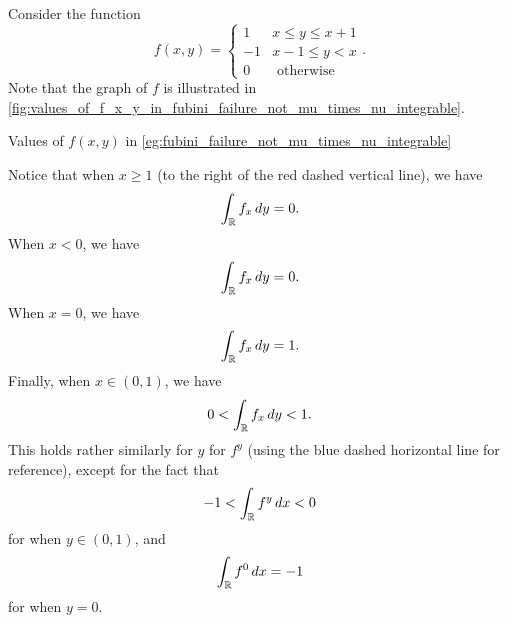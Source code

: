 \documentclass[notoc,notitlepage]{tufte-book}
\begin{document}
\begin{eg}\label{eg:fubini_failure_not_mu_times_nu_integrable}
  Consider the function
  \begin{equation*}
    f(x, y) = \begin{cases}
      1 & x \leq y \leq x + 1 \\
      -1 & x - 1 \leq y < x \\
      0 & \text{ otherwise }
    \end{cases}.
  \end{equation*}
  Note that the graph of $f$ is illustrated in
  \cref{fig:values_of_f_x_y_in_fubini_failure_not_mu_times_nu_integrable}.
  \begin{marginfigure}
    \centering
    \caption{Values of $f(x, y)$ in \cref{eg:fubini_failure_not_mu_times_nu_integrable}}\label{fig:values_of_f_x_y_in_fubini_failure_not_mu_times_nu_integrable}
  \end{marginfigure}

  Notice that when $x \geq 1$ (to the right of the red dashed vertical line),
  we have
  \begin{equation*}
    \int_{\mathbb{R}} f_x \mathop{}\!d{y} = 0.
  \end{equation*}
  When $x < 0$, we have
  \begin{equation*}
    \int_{\mathbb{R}} f_x \mathop{}\!d{y} = 0.
  \end{equation*}
  When $x = 0$, we have
  \begin{equation*}
    \int_{\mathbb{R}} f_x \mathop{}\!d{y} = 1.
  \end{equation*}
  Finally, when $x \in (0, 1)$, we have
  \begin{equation*}
    0 < \int_{\mathbb{R}} f_x \mathop{}\!d{y} < 1.
  \end{equation*}
  This holds rather similarly for $y$ for $f^y$
  (using the blue dashed horizontal line for reference),
  except for the fact that
  \begin{equation*}
    -1 < \int_{\mathbb{R}} f^y \mathop{}\!d{x} < 0
  \end{equation*}
  for when $y \in (0, 1)$, and
  \begin{equation*}
    \int_{\mathbb{R}} f^0 \mathop{}\!d{x} = -1
  \end{equation*}
  for when $y = 0$.


\end{eg}
\end{document}

